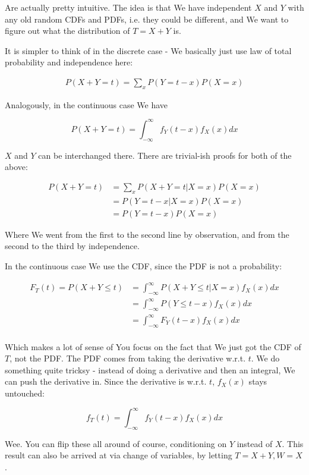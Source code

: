 \documentclass{article}
\begin{document}
		Are actually pretty intuitive. The idea is that We have independent $X$ and $Y$ with any old random CDFs and PDFs, i.e. they could be different, and We want to figure out what the distribution of $T = X+Y$ is.
		
		It is simpler to think of in the discrete case - We basically just use law of total probability and independence here:
		
		\begin{align*}
		P(X+Y=t) = \sum_x P(Y=t-x)P(X=x)
		\end{align*}
		
		Analogously, in the continuous case We have
		
		\[ P(X+Y = t) = \int^\infty_{-\infty} f_Y(t-x)f_X(x)dx\]
		
		$X$ and $Y$ can be interchanged there. There are trivial-ish proofs for both of the above:
		
		\begin{align*}
		P(X+Y=t) &= \sum_x P(X+Y=t|X=x)P(X=x)\\
		&= P(Y=t-x|X=x)P(X=x) \\
		&= P(Y=t-x)P(X=x)
		\end{align*}
		
		Where We went from the first to the second line by observation, and from the second to the third by independence.
		
		In the continuous case We use the CDF, since the PDF is not a probability:
		
		\begin{align*}
		F_T(t) = P(X+Y\le t) &= \int^\infty_{-\infty} P(X+Y\le t|X=x)f_X(x) dx\\
		&= \int^\infty_{-\infty} P(Y\le t-x)f_X(x) dx\\
		&= \int^\infty_{-\infty} F_{Y}(t-x)f_X(x) dx\\
		\end{align*}
		
		Which makes a lot of sense of You focus on the fact that We just got the CDF of $T$, not the PDF. The PDF comes from taking the derivative w.r.t. $t$. We do something quite tricksy - instead of doing a derivative and then an integral, We can push the derivative in. Since the derivative is w.r.t. $t$, $f_X(x)$ stays untouched:
		
		\[ f_T(t) = \int^\infty_{-\infty} f_Y(t-x)f_X(x) dx \]
		
		Wee. You can flip these all around of course, conditioning on $Y$ instead of $X$. This result can also be arrived at via change of variables, by letting $T=X+Y, W=X$.
		
\end{document}
